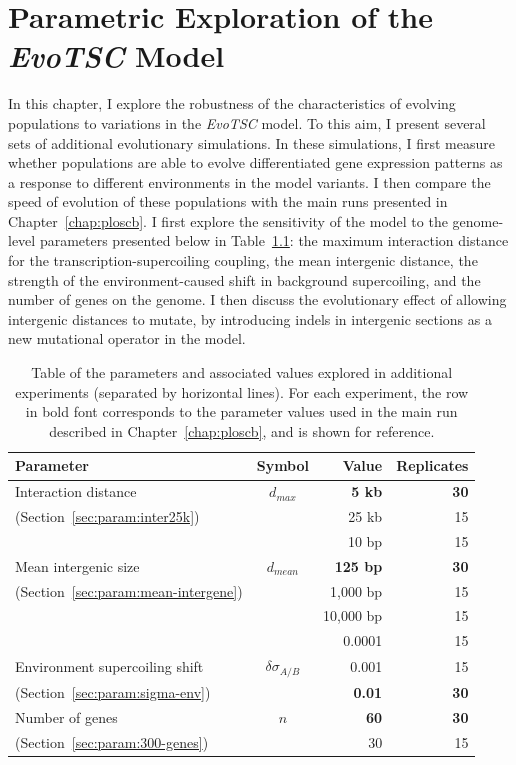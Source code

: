 \chapter{Parametric Exploration of the \emph{EvoTSC} Model}
\label{chap:param}

In this chapter, I explore the robustness of the characteristics of evolving populations to variations in the \emph{EvoTSC} model.
To this aim, I present several sets of additional evolutionary simulations.
In these simulations, I first measure whether populations are able to evolve differentiated gene expression patterns as a response to different environments in the model variants.
I then compare the speed of evolution of these populations with  the main runs presented in Chapter~\ref{chap:ploscb}.
I first explore the sensitivity of the model to the genome-level parameters presented below in Table~\ref{tab:param:params}: the maximum interaction distance for the transcription-supercoiling coupling, the mean intergenic distance, the strength of the environment-caused shift in background supercoiling, and the number of genes on the genome.
I then discuss the evolutionary effect of allowing intergenic distances to mutate, by introducing indels in intergenic sections as a new mutational operator in the model.

\begin{table}[H]
\begin{center}
\begin{tabular}{l c r r}
\toprule
\textbf{Parameter} & \textbf{Symbol} & \textbf{Value} & \textbf{Replicates} \\
\midrule
Interaction distance & $d_{max}$ & \textbf{5 kb} & \textbf{30}\\
(Section~\ref{sec:param:inter25k}) & & 25 kb & 15\\
\midrule
& & 10 bp& 15\\
Mean intergenic size & $d_{mean}$ & \textbf{125 bp} & \textbf{30} \\
(Section~\ref{sec:param:mean-intergene})& & 1,000 bp & 15\\
& & 10,000 bp & 15 \\
\midrule
& & 0.0001 & 15\\
Environment supercoiling shift & $\delta\sigma_{A/B}$ & 0.001 & 15\\
(Section~\ref{sec:param:sigma-env})& & \textbf{0.01} & \textbf{30}\\
\midrule
Number of genes & $n$ & \textbf{60} & \textbf{30} \\
(Section~\ref{sec:param:300-genes})& & 30 & 15 \\
\bottomrule
\end{tabular}
\end{center}
\caption[Table of parameter values explored in additional \emph{EvoTSC} simulations]{Table of the parameters and associated values explored in additional experiments (separated by horizontal lines).
For each experiment, the row in bold font corresponds to the parameter values used in the main run described in Chapter~\ref{chap:ploscb}, and is shown for reference.}
\label{tab:param:params}
\end{table}

